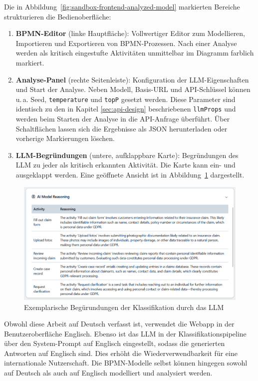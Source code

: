 Die in Abbildung~\ref{fig:sandbox-frontend-analyzed-model} markierten Bereiche strukturieren die Bedienoberfläche:

\begin{enumerate}
    \item \textbf{BPMN-Editor} (linke Hauptfläche): Vollwertiger Editor zum Modellieren, Importieren und Exportieren von \ac{BPMN}-Prozessen. Nach einer Analyse werden als kritisch eingestufte Aktivitäten unmittelbar im Diagramm farblich markiert.
    \item \textbf{Analyse-Panel} (rechte Seitenleiste): Konfiguration der \ac{LLM}-Eigenschaften und Start der Analyse. Neben Modell, Basis-URL und API-Schlüssel können u.\,a. Seed, \texttt{temperature} und \texttt{topP} gesetzt werden. Diese Parameter sind identisch zu den in Kapitel \ref{sec:api-design} beschriebenen \texttt{llmProps} und werden beim Starten der Analyse in die API-Anfrage überführt. Über Schaltflächen lassen sich die Ergebnisse als JSON herunterladen oder vorherige Markierungen löschen.
    \item \textbf{\ac{LLM}-Begründungen} (untere, aufklappbare Karte): Begründungen des \ac{LLM} zu jeder als kritisch erkannten Aktivität. Die Karte kann ein- und ausgeklappt werden. Eine geöffnete Ansicht ist in Abbildung~\ref{fig:sandbox-frontend-ai-reasoning} dargestellt.
\end{enumerate}

\begin{figure}[h]
    \centering
    \includegraphics[width=.92\linewidth]{images/sandbox/sandbox-ai-reasoning}
    \caption{Exemplarische Begürundungen der Klassifikation durch das LLM}
    \label{fig:sandbox-frontend-ai-reasoning}
\end{figure}

Obwohl diese Arbeit auf Deutsch verfasst ist, verwendet die Webapp in der Benutzeroberfläche Englisch. Ebenso ist das \ac{LLM} in der Klassifikationspipeline über den System-Prompt auf Englisch eingestellt, sodass die generierten Antworten auf Englisch sind. Dies erhöht die Wiederverwendbarkeit für eine internationale Nutzerschaft. Die \ac{BPMN}-Modelle selbst können hingegen sowohl auf Deutsch als auch auf Englisch modelliert und analysiert werden.